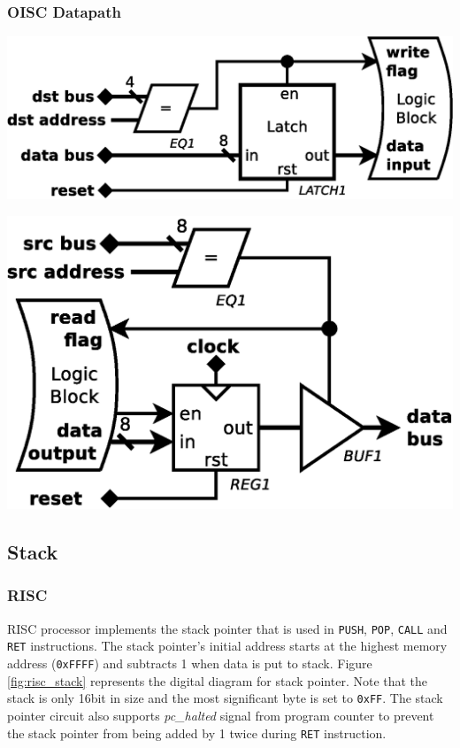 \subsubsection{OISC Datapath} \label{subsec:oisc_cells}

\begin{colfigure}
	\centering
	\includegraphics[width=\linewidth]{../resources/oisc_cell_in.eps}
	\label{fig:oisc_cell_in}
\end{colfigure}

\begin{colfigure}
	\centering
	\includegraphics[width=\linewidth]{../resources/oisc_cell_out.eps}
	\label{fig:oisc_cell_out}
\end{colfigure}


\subsection{Stack} \label{subsec:stack}

\subsubsection{RISC}
RISC processor implements the stack pointer that is used in \texttt{PUSH}, \texttt{POP}, \texttt{CALL} and \texttt{RET} instructions. The stack pointer's initial address starts at the highest memory address (\texttt{0xFFFF}) and subtracts 1 when data is put to stack. Figure \ref{fig:risc_stack} represents the digital diagram for stack pointer. Note that the stack is only 16bit in size and the most significant byte is set to \texttt{0xFF}. The stack pointer circuit also supports \textit{pc\_halted} signal from program counter to prevent the stack pointer from being added by 1 twice during \texttt{RET} instruction. 

